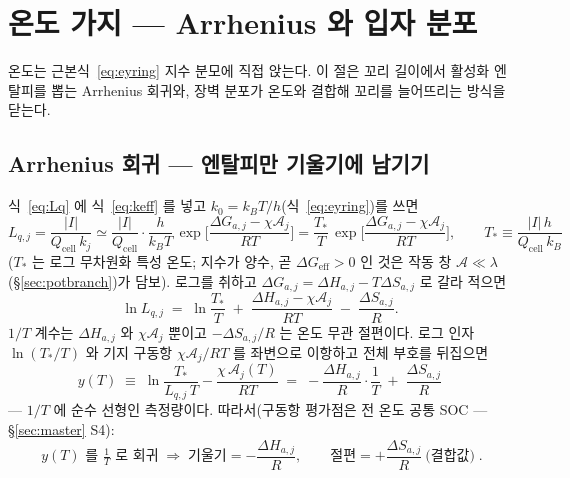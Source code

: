 \documentclass[11pt,a4paper]{article}
\newcommand{\eff}{\mathrm{eff}}
\newcommand{\cell}{\mathrm{cell}}
\begin{document}
\section{온도 가지 — Arrhenius 와 입자 분포}\label{sec:tempbranch}
온도는 근본식~\eqref{eq:eyring} 지수 분모에 직접 앉는다. 이 절은 꼬리 길이에서 활성화 엔탈피를 뽑는 Arrhenius 회귀와, 장벽 분포가 온도와 결합해 꼬리를 늘어뜨리는 방식을 닫는다.

\subsection{Arrhenius 회귀 — 엔탈피만 기울기에 남기기}
식~\eqref{eq:Lq} 에 식~\eqref{eq:keff} 를 넣고 $k_0=k_BT/h$(식~\eqref{eq:eyring})를 쓰면
\begin{equation}
L_{q,j}=\frac{|I|}{Q_\cell\,k_j}
\simeq\frac{|I|}{Q_\cell}\cdot\frac{h}{k_BT}\,
\exp\!\Big[\frac{\Delta G_{a,j}-\chi\mathcal A_j}{RT}\Big]
=\frac{T_*}{T}\,\exp\!\Big[\frac{\Delta G_{a,j}-\chi\mathcal A_j}{RT}\Big],
\qquad T_*\equiv\frac{|I|\,h}{Q_\cell\,k_B}
\label{eq:LqT}
\end{equation}
($T_*$ 는 로그 무차원화 특성 온도; 지수가 양수, 곧 $\Delta G_{\eff}>0$ 인 것은 작동 창 $\mathcal A\ll\lambda$(\S\ref{sec:potbranch})가 담보). 로그를 취하고 $\Delta G_{a,j}=\Delta H_{a,j}-T\Delta S_{a,j}$ 로 갈라 적으면
\begin{equation}
\ln L_{q,j}\;=\;\ln\frac{T_*}{T}\;+\;\frac{\Delta H_{a,j}-\chi\mathcal A_j}{RT}
\;-\;\frac{\Delta S_{a,j}}{R}.
\label{eq:lnLq}
\end{equation}
$1/T$ 계수는 $\Delta H_{a,j}$ 와 $\chi\mathcal A_j$ 뿐이고 $-\Delta S_{a,j}/R$ 는 온도 무관 절편이다. 로그 인자 $\ln(T_*/T)$ 와 기지 구동항 $\chi\mathcal A_j/RT$ 를 좌변으로 이항하고 전체 부호를 뒤집으면
\begin{equation}
y(T)\;\equiv\;\ln\frac{T_*}{L_{q,j}\,T}-\frac{\chi\,\mathcal A_j(T)}{RT}
\;=\;-\frac{\Delta H_{a,j}}{R}\cdot\frac1T\;+\;\frac{\Delta S_{a,j}}{R}
\label{eq:ydef}
\end{equation}
— $1/T$ 에 순수 선형인 측정량이다. 따라서(구동항 평가점은 전 온도 공통 SOC — \S\ref{sec:master} S4):
\begin{equation}
\boxed{\;y(T)\text{ 를 }\tfrac1T\text{ 로 회귀}\;\Rightarrow\;
\text{기울기}=-\frac{\Delta H_{a,j}}{R},\qquad
\text{절편}=+\frac{\Delta S_{a,j}}{R}\ \text{(결합값)}\;.}
\label{eq:arrhenius}
\end{equation}
\end{document}

